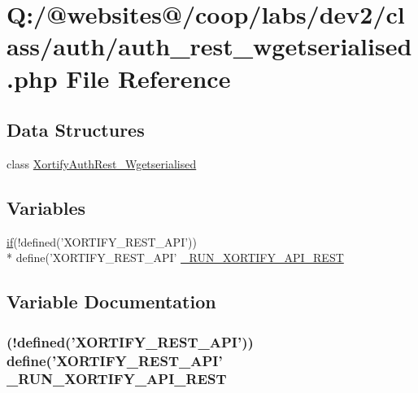\hypertarget{auth__rest__wgetserialised_8php}{\section{Q\-:/@websites@/coop/labs/dev2/class/auth/auth\-\_\-rest\-\_\-wgetserialised.php File Reference}
\label{auth__rest__wgetserialised_8php}
}
\subsection*{Data Structures}
\begin{DoxyCompactItemize}
\item 
class \hyperlink{class_xortify_auth_rest___wgetserialised}{Xortify\-Auth\-Rest\-\_\-\-Wgetserialised}
\end{DoxyCompactItemize}
\subsection*{Variables}
\begin{DoxyCompactItemize}
\item 
\hyperlink{index_8php_ae2ccdf355624402b65fc2226f2a661cd}{if}(!defined('X\-O\-R\-T\-I\-F\-Y\-\_\-\-R\-E\-S\-T\-\_\-\-A\-P\-I')) \\*
define('X\-O\-R\-T\-I\-F\-Y\-\_\-\-R\-E\-S\-T\-\_\-\-A\-P\-I' \hyperlink{auth__rest__wgetserialised_8php_a731f04083e48e3087b2f5cad38672473}{\-\_\-\-R\-U\-N\-\_\-\-X\-O\-R\-T\-I\-F\-Y\-\_\-\-A\-P\-I\-\_\-\-R\-E\-S\-T}
\end{DoxyCompactItemize}


\subsection{Variable Documentation}
\hypertarget{auth__rest__wgetserialised_8php_a731f04083e48e3087b2f5cad38672473}{
\subsubsection[{\-\_\-\-R\-U\-N\-\_\-\-X\-O\-R\-T\-I\-F\-Y\-\_\-\-A\-P\-I\-\_\-\-R\-E\-S\-T}]{ (!defined('X\-O\-R\-T\-I\-F\-Y\-\_\-\-R\-E\-S\-T\-\_\-\-A\-P\-I')) define('X\-O\-R\-T\-I\-F\-Y\-\_\-\-R\-E\-S\-T\-\_\-\-A\-P\-I' \-\_\-\-R\-U\-N\-\_\-\-X\-O\-R\-T\-I\-F\-Y\-\_\-\-A\-P\-I\-\_\-\-R\-E\-S\-T}}\label{auth__rest__wgetserialised_8php_a731f04083e48e3087b2f5cad38672473}
